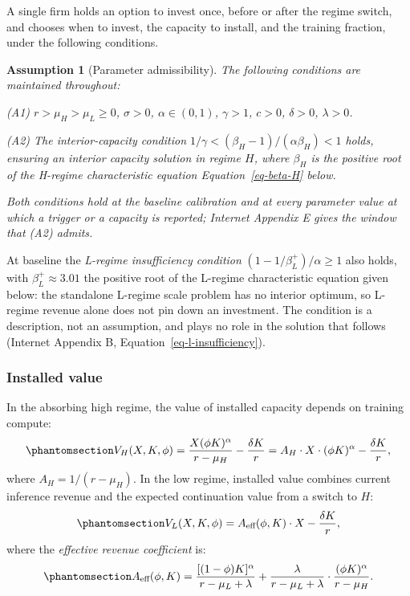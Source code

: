 \documentclass[
  11pt,
  letterpaper,
]{scrartcl}
\begin{document}
A single firm holds an option to invest once, before or after the regime
switch, and chooses when to invest, the capacity to install, and the
training fraction, under the following conditions.

\textbf{Assumption 1} (Parameter admissibility). \emph{The following
conditions are maintained throughout:}

\emph{(A1) \(r > \mu_H > \mu_L \geq 0\), \(\sigma > 0\),
\(\alpha \in (0,1)\), \(\gamma > 1\), \(c > 0\), \(\delta > 0\),
\(\lambda > 0\).}

\emph{(A2) The interior-capacity condition
\(1/\gamma < (\beta_H - 1)/(\alpha \beta_H) < 1\) holds, ensuring an
interior capacity solution in regime \(H\), where \(\beta_H\) is the
positive root of the H-regime characteristic equation
Equation~\ref{eq-beta-H} below.}

\emph{Both conditions hold at the baseline calibration and at every
parameter value at which a trigger or a capacity is reported; Internet
Appendix E gives the window that (A2) admits.}

At baseline the \emph{L-regime insufficiency condition}
\((1 - 1/\beta_L^+)/\alpha \geq 1\) also holds, with
\(\beta_L^+ \approx 3.01\) the positive root of the L-regime
characteristic equation given below: the standalone L-regime scale
problem has no interior optimum, so L-regime revenue alone does not pin
down an investment. The condition is a description, not an assumption,
and plays no role in the solution that follows (Internet Appendix B,
Equation~\ref{eq-l-insufficiency}).

\subsubsection{Installed value}\label{installed-value}

In the absorbing high regime, the value of installed capacity depends on
training compute:
\begin{equation}\protect\phantomsection\label{eq-installed-value-H}{
V_H(X, K, \phi) = \frac{X (\phi K)^\alpha}{r - \mu_H} - \frac{\delta K}{r} = A_H \cdot X \cdot (\phi K)^\alpha - \frac{\delta K}{r},
}\end{equation} where \(A_H = 1/(r - \mu_H)\). In the low regime,
installed value combines current inference revenue and the expected
continuation value from a switch to \(H\):
\begin{equation}\protect\phantomsection\label{eq-installed-value-L}{
V_L(X, K, \phi) = A_{\text{eff}}(\phi, K) \cdot X - \frac{\delta K}{r},
}\end{equation} where the \emph{effective revenue coefficient} is:
\begin{equation}\protect\phantomsection\label{eq-a-eff}{
A_{\text{eff}}(\phi, K) = \frac{[(1-\phi)K]^\alpha}{r - \mu_L + \lambda} + \frac{\lambda}{r - \mu_L + \lambda} \cdot \frac{(\phi K)^\alpha}{r - \mu_H}.
}\end{equation}
\end{document}
